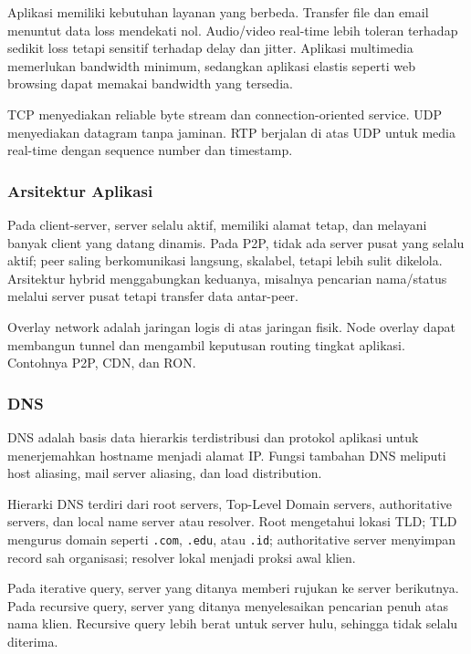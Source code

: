 Aplikasi memiliki kebutuhan layanan yang berbeda. Transfer file dan email menuntut data loss mendekati nol. Audio/video real-time lebih toleran terhadap sedikit loss tetapi sensitif terhadap delay dan jitter. Aplikasi multimedia memerlukan bandwidth minimum, sedangkan aplikasi elastis seperti web browsing dapat memakai bandwidth yang tersedia.

TCP menyediakan reliable byte stream dan connection-oriented service. UDP menyediakan datagram tanpa jaminan. RTP berjalan di atas UDP untuk media real-time dengan sequence number dan timestamp.

\subsubsection*{Arsitektur Aplikasi}

Pada client-server, server selalu aktif, memiliki alamat tetap, dan melayani banyak client yang datang dinamis. Pada P2P, tidak ada server pusat yang selalu aktif; peer saling berkomunikasi langsung, skalabel, tetapi lebih sulit dikelola. Arsitektur hybrid menggabungkan keduanya, misalnya pencarian nama/status melalui server pusat tetapi transfer data antar-peer.

Overlay network adalah jaringan logis di atas jaringan fisik. Node overlay dapat membangun tunnel dan mengambil keputusan routing tingkat aplikasi. Contohnya P2P, CDN, dan RON.

\subsubsection*{DNS}

DNS adalah basis data hierarkis terdistribusi dan protokol aplikasi untuk menerjemahkan hostname menjadi alamat IP. Fungsi tambahan DNS meliputi host aliasing, mail server aliasing, dan load distribution.

Hierarki DNS terdiri dari root servers, Top-Level Domain servers, authoritative servers, dan local name server atau resolver. Root mengetahui lokasi TLD; TLD mengurus domain seperti \texttt{.com}, \texttt{.edu}, atau \texttt{.id}; authoritative server menyimpan record sah organisasi; resolver lokal menjadi proksi awal klien.

Pada iterative query, server yang ditanya memberi rujukan ke server berikutnya. Pada recursive query, server yang ditanya menyelesaikan pencarian penuh atas nama klien. Recursive query lebih berat untuk server hulu, sehingga tidak selalu diterima.

